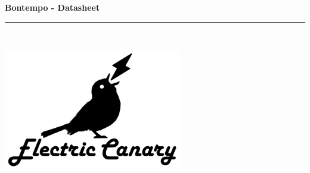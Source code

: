 \documentclass[a4paper, 10pt]{article}
\begin{document}
\thispagestyle{plain}
\begin{center}
\begin{Huge}
\vspace*{0.5cm}
\textbf{Bontempo - Datasheet}
\rule {0.95\textwidth}{2pt}\\
\end{Huge}
\vspace{1cm}
\includegraphics[scale=1]{logocentre}\\
\end{center}
\vspace{1cm}
\end{document}

